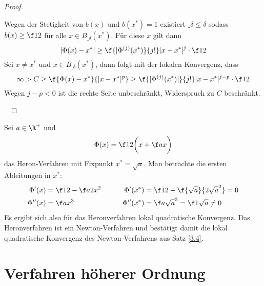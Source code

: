 \documentclass[11pt]{scrbook}
\begin{document}
\begin{st}[Konvergenzordnung für Iterationsverfahren, $n=1$]
\begin{proof}
\begin{seg}[„$\Longrightarrow$“]
\begin{seg}[$p\ge 2$]
				Wegen der Stetigkeit von $b(x)$ und $b(x^*)=1$ existiert $\_\delta \le \delta$ sodass $b(x) \ge \f 12$ für alle $x\in B_{\_\delta}(x^*)$.
				Für diese $x$ gilt dann
				\[
					|\Phi(x) - x^*| \ge \f {|\Phi^{(j)}(x^*)}{j!}|x-x^*|^j \cdot \f 12
				\]
				Sei $x\neq x^*$ und $x\in B_{\_\delta}(x^*)$, dann folgt mit der lokalen Konvergenz, dass
				\[
					\infty > C \ge \f {\Phi(x)-x^*}{|x-x^*|^p} \ge \f {|\Phi^{(j)}(x^*)|}{j!} |x-x^*|^{j-p} \cdot \f 12
				\]
				Wegen $j-p < 0$ ist die rechte Seite unbeschränkt, Widerspruch zu $C$ beschränkt.
			\end{seg}
		\end{seg}~
	\end{proof}
\end{st}

\begin{ex*}
	Sei $a\in \R^+$ und
	\[
		\Phi(x) = \f 12 \bigg(x + \f ax\bigg)
	\]
	das Heron-Verfahren mit Fixpunkt $x^* = \sqrt a$.
	Man betrachte die ersten Ableitungen in $x^*$:
	\begin{alignat*}{2}
		\Phi'(x) &= \f 12 - \f a{2x^2} & \qquad \Phi'(x^*) &= \f 12 - \f {\sqrt a}{2\sqrt{a}^2} = 0 \\
		\Phi''(x) &= \f a{x^3} & \qquad \Phi''(x^*) &= \f a{\sqrt{a}^3} = \f 1{\sqrt a} \neq 0
	\end{alignat*}
	Es ergibt sich also für das Heronverfahren lokal quadratische Konvergenz.
	Das Heronverfahren ist ein Newton-Verfahren und bestätigt damit die lokal quadratische Konvergenz des Newton-Verfahrens aus Satz \ref{3.4}.
\end{ex*}


\section{Verfahren höherer Ordnung}
\end{document}
